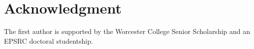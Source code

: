 \documentclass[journal]{IEEEtran}
\theoremstyle{remark}
\theoremstyle{definition}
\begin{document}
%


\appendices


\section*{Acknowledgment}

The first author is supported by the Worcester College Senior Scholarship and an EPSRC doctoral studentship.  



\ifCLASSOPTIONcaptionsoff
  \newpage
\fi








%
\end{document}
